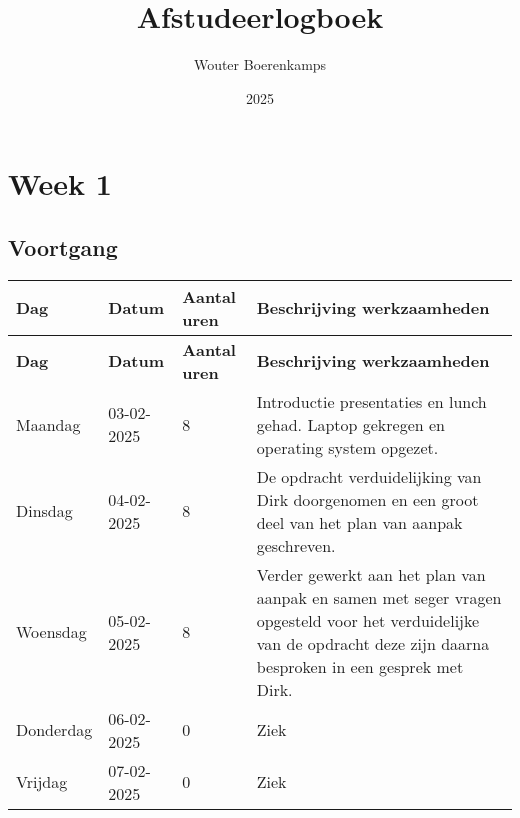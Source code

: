 \documentclass[a4paper,12pt]{article}
\title{Afstudeerlogboek}
\author{Wouter Boerenkamps}
\date{2025}
\begin{document}
\maketitle

\newpage

\section*{Week 1}

\subsection*{Voortgang}

\begin{longtable}{|l|l|p{}|p{}|}
\hline
\textbf{Dag} & \textbf{Datum} & \textbf{Aantal uren} & \textbf{Beschrijving werkzaamheden} \\
\hline
\endfirsthead
\hline
\textbf{Dag} & \textbf{Datum} & \textbf{Aantal uren} & \textbf{Beschrijving werkzaamheden} \\
\hline
\endhead
\hline
\endfoot
\endlastfoot
Maandag   & 03-02-2025 & 8 & Introductie presentaties en lunch gehad. Laptop gekregen en operating system opgezet.  \\ \hline
Dinsdag   & 04-02-2025 & 8 & De opdracht verduidelijking van Dirk doorgenomen en een groot deel van het plan van aanpak geschreven. \\ \hline
Woensdag  & 05-02-2025 & 8 & Verder gewerkt aan het plan van aanpak en samen met seger vragen opgesteld voor het verduidelijke van de opdracht deze zijn daarna besproken in een gesprek met Dirk.\\ \hline
Donderdag & 06-02-2025 & 0 & Ziek \\ \hline
Vrijdag   & 07-02-2025 & 0 & Ziek \\ \hline

\hline

\end{longtable}
\end{document}
